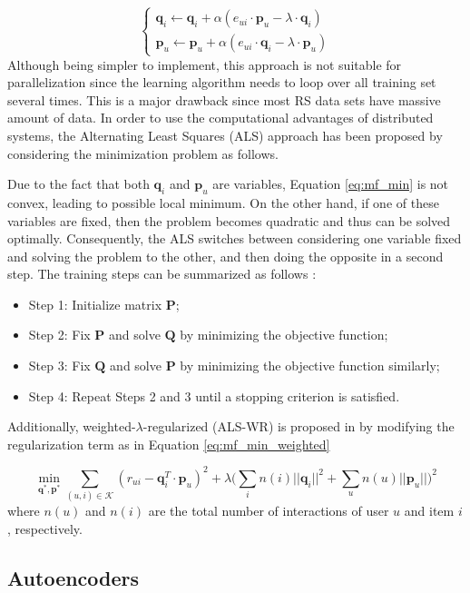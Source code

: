     \begin{equation}
        \label{eq:sgd}
            \begin{cases}
            \mathbf{q}_i \leftarrow \mathbf{q}_i + \alpha (e_{ui}\cdot \mathbf{p}_u-\lambda \cdot \mathbf{q}_i) \\
            
            \mathbf{p}_u \leftarrow \mathbf{p}_u + \alpha (e_{ui}\cdot \mathbf{q}_i-\lambda \cdot \mathbf{p}_u)
            \end{cases}
    \end{equation} Although being simpler to implement, this approach is not suitable for parallelization since the learning algorithm needs to loop over all training set several times. This is a major drawback since most RS data sets have massive amount of data. In order to use the computational advantages of distributed systems, the Alternating Least Squares (ALS)  approach has been proposed by considering the minimization problem as follows.
    
    Due to the fact that both $\mathbf{q}_i$ and $\mathbf{p}_u$ are variables, Equation \ref{eq:mf_min} is not convex, leading to possible local minimum. On the other hand, if one of these variables are fixed, then the problem becomes quadratic and thus can be solved optimally. Consequently, the ALS switches between considering one variable fixed and solving the problem to the other, and then doing the opposite in a second step. The training steps can be summarized as follows \cite{2008ALSWR}:
    
    \begin{itemize}
        \item Step 1: Initialize matrix $\mathbf{P}$;
        \item Step 2: Fix $\mathbf{P}$ and solve $\mathbf{Q}$ by minimizing the objective function;
        \item Step 3: Fix $\mathbf{Q}$ and solve $\mathbf{P}$ by minimizing the objective function similarly;
        \item Step 4: Repeat Steps 2 and 3 until a stopping criterion is satisfied.
    \end{itemize}
    
    Additionally, weighted-$\lambda$-regularized (ALS-WR) is proposed in \cite{2008ALSWR} by modifying the regularization term as in Equation \ref{eq:mf_min_weighted}
    
    \begin{equation}
        \label{eq:mf_min_weighted}
        \min_{\mathbf{q}^*, \mathbf{p}^*} \sum_{(u,i) \in \mathcal{K}} (r_{ui} - \mathbf{q}^T_i \cdot \mathbf{p}_u)^2 + \lambda \Big(\sum_i n(i)||\mathbf{q}_i||^2 + \sum_u n(u)||\mathbf{p}_u||\Big)^2
    \end{equation} where $n(u)$ and $n(i)$ are the total number of interactions of user $u$ and item $i$, respectively.

\subsection{Autoencoders}